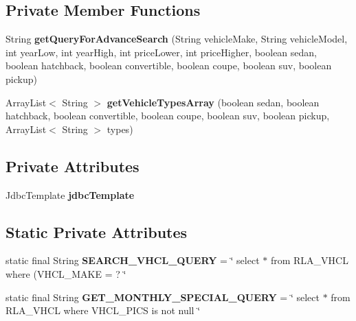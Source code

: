 \subsection*{Private Member Functions}
\begin{DoxyCompactItemize}
\item 
\mbox{\label{classrepository_1_1_vehicle_search_repository_af8cb004eb52ceba40b7c52545829910a}} 
String {\bfseries get\+Query\+For\+Advance\+Search} (String vehicle\+Make, String vehicle\+Model, int year\+Low, int year\+High, int price\+Lower, int price\+Higher, boolean sedan, boolean hatchback, boolean convertible, boolean coupe, boolean suv, boolean pickup)
\item 
\mbox{\label{classrepository_1_1_vehicle_search_repository_a16675dd783fdffb326ad796ec7aa4f11}} 
Array\+List$<$ String $>$ {\bfseries get\+Vehicle\+Types\+Array} (boolean sedan, boolean hatchback, boolean convertible, boolean coupe, boolean suv, boolean pickup, Array\+List$<$ String $>$ types)
\end{DoxyCompactItemize}
\subsection*{Private Attributes}
\begin{DoxyCompactItemize}
\item 
\mbox{\label{classrepository_1_1_vehicle_search_repository_a91d2a294bc6300ba8e04598c78fd26f5}} 
Jdbc\+Template {\bfseries jdbc\+Template}
\end{DoxyCompactItemize}
\subsection*{Static Private Attributes}
\begin{DoxyCompactItemize}
\item 
\mbox{\label{classrepository_1_1_vehicle_search_repository_a27e4596d68f9dd8d48c6522e10e02d8f}} 
static final String {\bfseries S\+E\+A\+R\+C\+H\+\_\+\+V\+H\+C\+L\+\_\+\+Q\+U\+E\+RY} = \char`\"{} select $\ast$ from R\+L\+A\+\_\+\+V\+H\+CL where (V\+H\+C\+L\+\_\+\+M\+A\+KE = ? \char`\"{}
\item 
\mbox{\label{classrepository_1_1_vehicle_search_repository_a2a391838e968688747d6b181ee3c2c4f}} 
static final String {\bfseries G\+E\+T\+\_\+\+M\+O\+N\+T\+H\+L\+Y\+\_\+\+S\+P\+E\+C\+I\+A\+L\+\_\+\+Q\+U\+E\+RY} = \char`\"{} select $\ast$ from R\+L\+A\+\_\+\+V\+H\+CL where V\+H\+C\+L\+\_\+\+P\+I\+CS is not null \char`\"{}
\end{DoxyCompactItemize}


